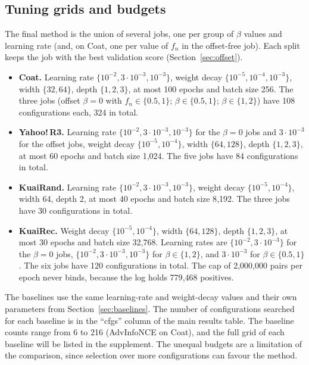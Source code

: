 \subsection{Tuning grids and budgets}\label{sec:grids}

The final method is the union of several jobs, one per group of $\beta$ values and learning rate (and,
on Coat, one per value of $f_n$ in the offset-free job). Each split keeps the job with the best
validation score (Section~\ref{sec:offset}).

\begin{itemize}
\item \textbf{Coat.} Learning rate $\{10^{-2},3\cdot10^{-3},10^{-3}\}$, weight decay
$\{10^{-5},10^{-4},10^{-3}\}$, width $\{32,64\}$, depth $\{1,2,3\}$, at most 100 epochs and batch size
256. The three jobs (offset $\beta=0$ with $f_n\in\{0.5,1\}$; $\beta\in\{0.5,1\}$; $\beta\in\{1,2\}$)
have 108 configurations each, 324 in total.
\item \textbf{Yahoo!\,R3.} Learning rate $\{10^{-2},3\cdot10^{-3},10^{-3}\}$ for the $\beta=0$ jobs and
$3\cdot10^{-3}$ for the offset jobs, weight decay $\{10^{-5},10^{-4}\}$, width $\{64,128\}$, depth
$\{1,2,3\}$, at most 60 epochs and batch size 1{,}024. The five jobs have 84 configurations in total.
\item \textbf{KuaiRand.} Learning rate $\{10^{-2},3\cdot10^{-3},10^{-3}\}$, weight decay
$\{10^{-5},10^{-4}\}$, width 64, depth 2, at most 40 epochs and batch size 8{,}192. The three jobs have
30 configurations in total.
\item \textbf{KuaiRec.} Weight decay $\{10^{-5},10^{-4}\}$, width $\{64,128\}$, depth $\{1,2,3\}$, at most
30 epochs and batch size 32{,}768. Learning rates are $\{10^{-2},3\cdot10^{-3}\}$ for the $\beta=0$ jobs,
$\{10^{-2},3\cdot10^{-3},10^{-3}\}$ for $\beta\in\{1,2\}$, and $3\cdot10^{-3}$ for $\beta\in\{0.5,1\}$. The
six jobs have 120 configurations in total. The cap of 2{,}000{,}000 pairs per epoch never binds, because
the log holds 779{,}468 positives.
\end{itemize}

The baselines use the same learning-rate and weight-decay values and their own parameters from
Section~\ref{sec:baselines}. The number of configurations searched for each baseline is in the ``cfgs''
column of the main results table. The baseline counts range from 6 to 216 (AdvInfoNCE on Coat), and
the full grid of each baseline will be listed in the supplement. The unequal budgets are a limitation
of the comparison, since selection over more configurations can favour the method.
